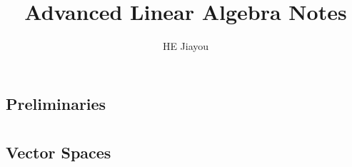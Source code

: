 \documentclass[]{report}
\title{Advanced Linear Algebra Notes}
\author{HE Jiayou}
\begin{document}
\maketitle
\tableofcontents

\chapter{Preliminaries}


\part{}

\chapter{Vector Spaces}

\end{document}
